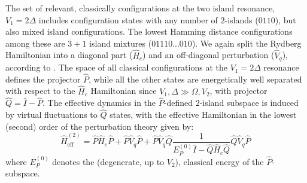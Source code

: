\documentclass[english,floatfix,twocolumn,showpacs, aps, prx, reprint, superscriptaddress, longbibliography]{revtex4-2}
\begin{document}
The set of relevant, classically configurations at the two island resonance, $V_1 = 2\Delta$ includes configuration states with any number of $2$-islands ($0110$), but also mixed island configurations. The lowest Hamming distance configurations among these are $3+1$ island mixtures ($01110...010$). We again split the Rydberg Hamiltonian into a diagonal part ($\hat{H}_c$) and an off-diagonal perturbation ($\hat{V}_q$), according to . The space of all classical configurations at the $V_1 = 2\Delta$ resonance defines the projector $\hat{P}$, while all the other states are energetically well separated with respect to the $\hat{H}_c$ Hamiltonian since $V_1, \Delta \gg \Omega, V_2$, with projector $\hat{Q} = \hat{I} - \hat{P}$. The effective dynamics in the $\hat{P}$-defined $2$-island subspace is induced by virtual fluctuations to $\hat{Q}$ states, with the effective Hamiltonian in the lowest (second) order of the perturbation theory given by:
\begin{equation}
\hat{H}_{\mathrm{eff}}^{(2)} 
= \hat{P} \hat{H}_{c} \hat{P}
+ \hat{P} \hat{V}_q \hat{P} 
+ \hat{P} \hat{V}_q \hat{Q} \frac{1}{E_P^{(0)}\hat{I} - \hat{Q} \hat{H}_c \hat{Q}} \hat{Q} \hat{V}_q \hat{P} \, 
\end{equation}
where $E_P^{(0)}$ denotes the (degenerate, up to $V_2$), classical energy of the $\hat{P}$-subspace. 
\end{document}
